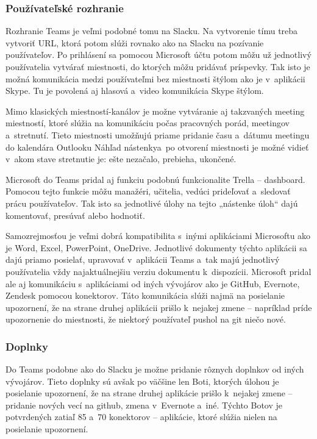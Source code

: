 \subsubsection{Používateľské rozhranie}
\indent Rozhranie Teams je veľmi podobné tomu na Slacku. Na vytvorenie tímu treba vytvoriť URL, ktorá potom slúži rovnako ako na Slacku na pozívanie používateľov. Po prihlásení sa pomocou Microsoft účtu potom môžu už jednotlivý používatelia vytvárať miestnosti, do ktorých môžu pridávať príspevky. Tak isto je možná komunikácia medzi používateľmi bez miestnosti štýlom ako je v aplikácii Skype. Tu je povolená aj hlasová a video komunikácia Skype štýlom. 

\indent Mimo klasických miestností-kanálov je možne vytváranie aj takzvaných meeting miestností, ktoré slúžia na komunikáciu počas pracovných porád, meetingov a stretnutí. Tieto miestnosti umožňujú priame pridanie času a dátumu meetingu do kalendára Outlooku Náhľad nástenkya po otvorení miestnosti je možné vidieť v akom stave stretnutie je: ešte nezačalo, prebieha, ukončené. 

\indent Microsoft do Teams pridal aj funkciu podobnú funkcionalite Trella – dashboard. Pomocou tejto funkcie môžu manažéri, učitelia, vedúci prideľovať a sledovať prácu používateľov. Tak isto sa jednotlivé úlohy na tejto „nástenke úloh“ dajú komentovať, presúvať alebo hodnotiť.

\indent Samozrejmosťou je veľmi dobrá kompatibilita s inými aplikáciami Microsoftu ako je Word, Excel, PowerPoint, OneDrive. Jednotlivé dokumenty týchto aplikácii sa dajú priamo posielať, upravovať v aplikácii Teams a tak majú jednotlivý používatelia vždy najaktuálnejšiu verziu dokumentu k dispozícii. Microsoft pridal ale aj komunikáciu s aplikáciami od iných vývojárov ako je GitHub, Evernote, Zendesk pomocou konektorov. Táto komunikácia slúži najmä na posielanie upozornení, že na strane druhej aplikácii prišlo k nejakej zmene – napríklad príde upozornenie do miestnosti, že niektorý používateľ pushol na git niečo nové.  
\subsubsection{Doplnky}
\indent Do Teams podobne ako do Slacku je možne pridanie rôznych doplnkov od iných vývojárov. Tieto doplnky sú avšak po väčšine len Boti, ktorých úlohou je posielanie upozornení, že na strane druhej aplikácie prišlo k nejakej zmene – pridanie nových vecí na github, zmena v Evernote a iné. Týchto Botov je potvrdených zatiaľ 85 a 70 konektorov – aplikácie, ktoré slúžia nielen na posielanie upozornení. 
